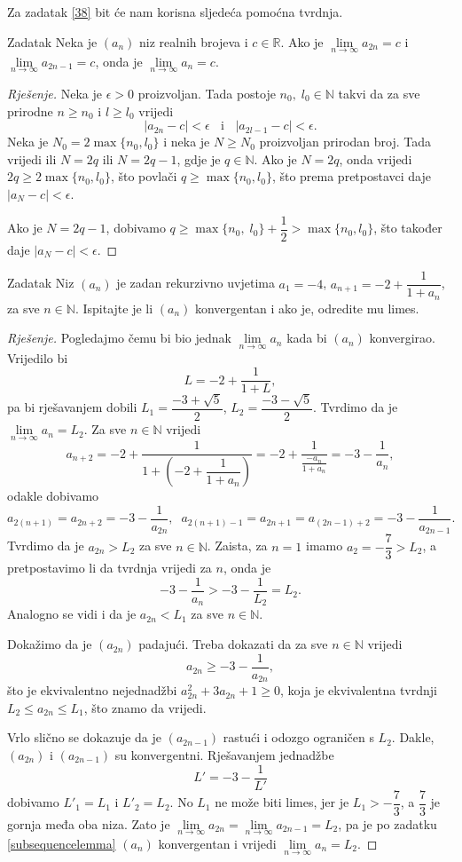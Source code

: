 Za zadatak \ref{38} bit će nam korisna sljedeća pomoćna tvrdnja.
\begin{exercise}{Zadatak}
\label{subsequencelemma}
Neka je \((a_n)\) niz realnih brojeva i \(c\in \mathbb{R}\). Ako je \(\lim\limits_{n\to \infty}{a_{2n}}=c\) i \(\lim\limits_{n\to \infty}{a_{2n-1}}=c\), onda je \(\lim\limits_{n\to \infty}{a_{n}}=c\).
\end{exercise}
\begin{proof}[Rješenje]
Neka je \(\epsilon>0\) proizvoljan. Tada postoje \(n_0,\; l_0\in \mathbb{N}\) takvi da za sve prirodne \(n\geq n_0\) i \(l\geq l_0\) vrijedi 
\[|a_{2n}-c|<\epsilon\;\;\text{ i }\;\;|a_{2l-1}-c|<\epsilon.\] 
Neka je \(N_0=2\max\{n_0, l_0\}\) i neka je \(N\geq N_0\) proizvoljan prirodan broj. Tada vrijedi ili \(N=2q\) ili \(N=2q-1\), gdje je \(q\in \mathbb{N}\). Ako je \(N=2q\), onda vrijedi \(2q\geq 2\max\{n_0, l_0\}\), što povlači \(q\geq \max\{n_0, l_0\}\), što prema pretpostavci daje \(|a_N-c|<\epsilon\). 

Ako je \(N=2q-1\), dobivamo \(q\geq \max\{n_0,\; l_0\}+\dfrac{1}{2}>\max\{n_0, l_0\}\), što također daje \(|a_N-c|<\epsilon\).
\end{proof}
\begin{exercise}{Zadatak}
\label{38}
Niz \((a_n)\) je zadan rekurzivno uvjetima \(a_1=-4\), \(a_{n+1}=-2+\dfrac{1}{1+a_n}\), za sve \(n\in \mathbb{N}\). Ispitajte je li \((a_n)\) konvergentan i ako je, odredite mu limes.
\end{exercise}
\begin{proof}[Rješenje]
Pogledajmo čemu bi bio jednak \(\lim\limits_{n\to \infty}{a_n}\) kada bi \((a_n)\) konvergirao. Vrijedilo bi
\[L=-2+\dfrac{1}{1+L},\]
pa bi rješavanjem dobili \(L_1=\dfrac{-3+\sqrt{5}}{2}\), \(L_2=\dfrac{-3-\sqrt{5}}{2}\). Tvrdimo da je \(\lim\limits_{n\to \infty}{a_n}=L_2\).
Za sve \(n\in \mathbb{N}\) vrijedi
\[a_{n+2}=-2+\dfrac{1}{1+\left(-2+\dfrac{1}{1+a_n}\right)}=-2+\dfrac{1}{\frac{-a_n}{1+a_n}}=-3-\dfrac{1}{a_n},\]
odakle dobivamo
\[a_{2(n+1)}=a_{2n+2}=-3-\dfrac{1}{a_{2n}},\;\; a_{2(n+1)-1}=a_{2n+1}=a_{(2n-1)+2}=-3-\dfrac{1}{a_{2n-1}}.\]
Tvrdimo da je \(a_{2n}> L_2\) za sve \(n\in \mathbb{N}\). Zaista, za \(n=1\) imamo \(a_2=-\dfrac{7}{3}>L_2\), a pretpostavimo li da tvrdnja vrijedi za \(n\), onda je
\[-3-\dfrac{1}{a_n}>-3-\dfrac{1}{L_2}=L_2.\]
Analogno se vidi i da je \(a_{2n}< L_1\) za sve \(n\in \mathbb{N}\).

Dokažimo da je \((a_{2n})\) padajući. Treba dokazati da za sve \(n\in \mathbb{N}\) vrijedi
\[a_{2n}\geq -3-\dfrac{1}{a_{2n}},\]
što je ekvivalentno nejednadžbi \(a_{2n}^2+3a_{2n}+1\geq 0\), koja je ekvivalentna tvrdnji \(L_2\leq a_{2n}\leq L_1\), što znamo da vrijedi.

Vrlo slično se dokazuje da je \((a_{2n-1})\) rastući i odozgo ograničen s \(L_2\). Dakle, \((a_{2n})\) i \((a_{2n-1})\) su konvergentni. Rješavanjem jednadžbe
\[L'=-3-\dfrac{1}{L'}\]
dobivamo \(L'_1=L_1\) i \(L'_2=L_2\). No \(L_1\) ne može biti limes, jer je \(L_1>-\dfrac{7}{3}\), a \(\dfrac{7}{3}\) je gornja međa oba niza. Zato je \(\lim\limits_{n\to \infty}{a_{2n}}=\lim\limits_{n\to \infty}{a_{2n-1}}=L_2\), pa je po zadatku \ref{subsequencelemma} \((a_n)\) konvergentan i vrijedi \(\lim\limits_{n\to \infty}{a_{n}}=L_2\).
\end{proof}
